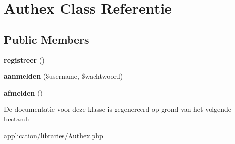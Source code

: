 \hypertarget{class_authex}{}\section{Authex Class Referentie}
\label{class_authex}
\subsection*{Public Members}
\begin{DoxyCompactItemize}
\item 
\mbox{\label{class_authex_a6db5689af94fb09c1652e5f3b1d2770a}} 
{\bfseries registreer} ()
\item 
\mbox{\label{class_authex_a060e394d781c0cafd27acdb6a4d43e8e}} 
{\bfseries aanmelden} (\$username, \$wachtwoord)
\item 
\mbox{\label{class_authex_a9eea5cd6fc12307fadeb90b79c2df3e2}} 
{\bfseries afmelden} ()
\end{DoxyCompactItemize}


De documentatie voor deze klasse is gegenereerd op grond van het volgende bestand\+:\begin{DoxyCompactItemize}
\item 
application/libraries/Authex.\+php\end{DoxyCompactItemize}
